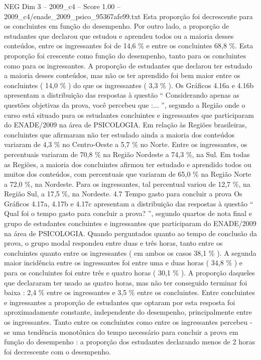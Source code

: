 \begin{textsample}{NEG Dim 3 – 2009\_c4 – Score 1.00 – 2009\_c4/enade\_2009\_psico\_95367afe99.txt}
Esta proporção foi decrescente para os concluintes em função do desempenho.
Por outro lado, a proporção de estudantes que declarou que estudou e aprendeu todos ou a maioria desses conteúdos, entre os ingressantes foi de 14,6 \% e entre os concluintes 68,8 \%.
Esta proporção foi crescente como função do desempenho, tanto para os concluintes como para os ingressantes.
A proporção de estudantes que declarou ter estudado a maioria desses conteúdos, mas não os ter aprendido foi bem maior entre os concluintes ( 14,0 \% ) do que os ingressantes ( 3,3 \% ).
Os Gráficos 4.16a e 4.16b apresentam a distribuição das respostas à questão “ Considerando apenas as questões objetivas da prova, você percebeu que :... ”, segundo a Região onde o curso está situado para os estudantes concluintes e ingressantes que participaram do ENADE/2009 na área de PSICOLOGIA.
Em relação às Regiões brasileiras, concluintes que afirmaram não ter estudado ainda a maioria dos conteúdos variaram de 4,3 \% no Centro-Oeste a 5,7 \% no Norte.
Entre os ingressantes, os percentuais variaram de 70,8 \% na Região Nordeste a 74,3 \%, na Sul.
Em todas as Regiões, a maioria dos concluintes afirmou ter estudado e aprendido todos ou muitos dos conteúdos, com percentuais que variaram de 65,0 \% na Região Norte a 72,0 \%, na Nordeste.
Para os ingressantes, tal percentual variou de 12,7 \%, na Região Sul, a 17,5 \%, na Nordeste. 4.7 Tempo gasto para concluir a prova Os Gráficos 4.17a, 4.17b e 4.17c apresentam a distribuição das respostas à questão “ Qual foi o tempo gasto para concluir a prova? ”, segundo quartos de nota final e grupo de estudantes concluintes e ingressantes que participaram do ENADE/2009 na área de PSICOLOGIA.
Quando perguntados quanto ao tempo de conclusão da prova, o grupo modal respondeu entre duas e três horas, tanto entre os concluintes quanto entre os ingressantes ( em ambos os casos 38,1 \% ).
A segunda maior incidência entre os ingressantes foi entre uma e duas horas ( 34,8 \% ) e para os concluintes foi entre três e quatro horas ( 30,1 \% ).
A proporção daqueles que declararam ter usado as quatro horas, mas não ter conseguido terminar foi baixa : 2,4 \% entre os ingressantes e 3,5 \% entre os concluintes.
Entre concluintes e ingressantes a proporção de estudantes que optaram por esta resposta foi aproximadamente constante, independente do desempenho, principalmente entre os ingressantes.
Tanto entre os concluintes como entre os ingressantes percebeu -se uma tendência monotônica do tempo necessário para concluir a prova em função do desempenho : a proporção dos estudantes declarando menos de 2 horas foi decrescente com o desempenho.

\end{textsample}
